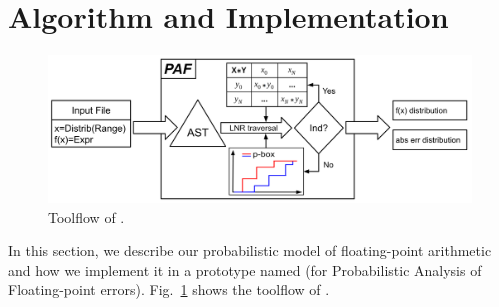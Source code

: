 \section{Algorithm and Implementation}\label{sec:model}


\begin{figure}[tb]
	\centering
	\includegraphics[width=\textwidth]{pics/toolflow.png}
	\caption{Toolflow of \Tool.}
	\label{fig:toolflow}
\end{figure}


In this section, we describe our probabilistic model of floating-point
arithmetic and how we implement it in a prototype named \Tool (for
Probabilistic Analysis of Floating-point errors).
%
Fig.~\ref{fig:toolflow} shows the toolflow of \Tool.
%

%
%
%


